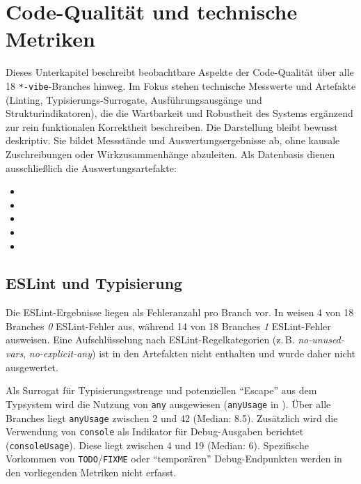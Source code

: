 \section{Code-Qualität und technische Metriken}
\label{sec:results_quality}

Dieses Unterkapitel beschreibt beobachtbare Aspekte der Code-Qualität über alle 18 \texttt{*-vibe}-Branches hinweg.
Im Fokus stehen technische Messwerte und Artefakte (Linting, Typisierungs-Surrogate, Ausführungsausgänge und Strukturindikatoren), die die Wartbarkeit und Robustheit des Systems ergänzend zur rein funktionalen Korrektheit beschreiben.
Die Darstellung bleibt bewusst deskriptiv. Sie bildet Messstände und Auswertungsergebnisse ab, ohne kausale Zuschreibungen oder Wirkzusammenhänge abzuleiten.
Als Datenbasis dienen ausschließlich die Auswertungsartefakte:
\begin{itemize}
    \item {}
    \item {}
    \item {}
    \item {}
    \item {}
\end{itemize}

\subsection{ESLint und Typisierung}
\label{sec:results_quality_lint_typing}

Die ESLint-Ergebnisse liegen als Fehleranzahl pro Branch vor.
In  weisen 4 von 18 Branches \emph{0} ESLint-Fehler aus, während 14 von 18 Branches \emph{1} ESLint-Fehler ausweisen.
Eine Aufschlüsselung nach ESLint-Regelkategorien (z.\,B. \emph{no-unused-vars}, \emph{no-explicit-any}) ist in den Artefakten nicht enthalten und wurde daher nicht ausgewertet.

Als Surrogat für Typisierungsstrenge und potenziellen ``Escape'' aus dem Typsystem wird die Nutzung von \texttt{any} ausgewiesen (\texttt{anyUsage} in ).
Über alle Branches liegt \texttt{anyUsage} zwischen 2 und 42 (Median: 8.5).
Zusätzlich wird die Verwendung von \texttt{console} als Indikator für Debug-Ausgaben berichtet (\texttt{consoleUsage}). Diese liegt zwischen 4 und 19 (Median: 6).
Spezifische Vorkommen von \texttt{TODO}/\texttt{FIXME} oder ``temporären'' Debug-Endpunkten werden in den vorliegenden Metriken nicht erfasst.

